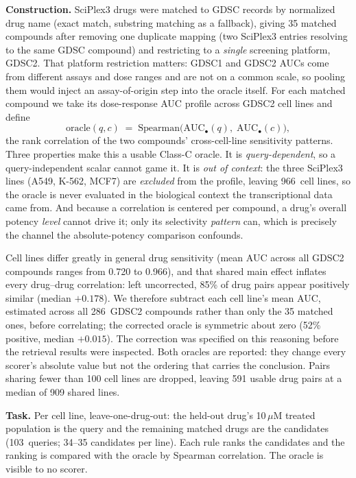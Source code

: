 \documentclass[11pt,letterpaper]{article}
\newcommand{\CTXLINES}{966}
\newcommand{\NGDSCDRUGS}{286}
\newcommand{\NCQUERIES}{103}
\begin{document}
\textbf{Construction.} SciPlex3 drugs were matched to GDSC records by normalized drug name (exact
match, substring matching as a fallback), giving 35 matched compounds after removing one
duplicate mapping (two SciPlex3 entries resolving to the same GDSC compound) and restricting to a
\emph{single} screening platform, GDSC2. That platform restriction matters: GDSC1 and GDSC2 AUCs
come from different assays and dose ranges and are not on a common scale, so pooling them would
inject an assay-of-origin step into the oracle itself. For each matched compound we take its
dose-response AUC profile across GDSC2 cell lines and define
\[
\mathrm{oracle}(q,c) \;=\; \mathrm{Spearman}\big(\mathrm{AUC}_{\bullet}(q),\;
\mathrm{AUC}_{\bullet}(c)\big),
\]
the rank correlation of the two compounds' cross-cell-line sensitivity patterns. Three properties
make this a usable Class-C oracle. It is \emph{query-dependent}, so a query-independent scalar
cannot game it. It is \emph{out of context}: the three SciPlex3 lines (A549, K-562, MCF7) are
\emph{excluded} from the profile, leaving \CTXLINES\ cell lines, so the oracle is never evaluated
in the biological context the transcriptional data came from. And because a correlation is
centered per compound, a drug's overall potency \emph{level} cannot drive it; only its selectivity
\emph{pattern} can, which is precisely the channel the absolute-potency comparison confounds.

Cell lines differ greatly in general drug sensitivity (mean AUC across all GDSC2 compounds ranges
from 0.720 to 0.966), and that shared main effect inflates every drug--drug correlation: left
uncorrected, 85\% of drug pairs appear positively similar (median $+0.178$). We therefore subtract
each cell line's mean AUC, estimated across all \NGDSCDRUGS\ GDSC2 compounds rather than only the
35 matched ones, before correlating; the corrected oracle is symmetric about zero (52\% positive,
median $+0.015$). The correction was specified on this reasoning before the retrieval results were
inspected. Both oracles are reported: they change every scorer's absolute value but not the
ordering that carries the conclusion. Pairs sharing fewer than 100 cell lines are dropped, leaving
591 usable drug pairs at a median of 909 shared lines.

\textbf{Task.} Per cell line, leave-one-drug-out: the held-out drug's 10\,$\mu$M treated
population is the query and the remaining matched drugs are the candidates (\NCQUERIES\ queries;
34--35 candidates per line). Each rule ranks the candidates and the ranking is compared with the
oracle by Spearman correlation. The oracle is visible to no scorer.
\end{document}
